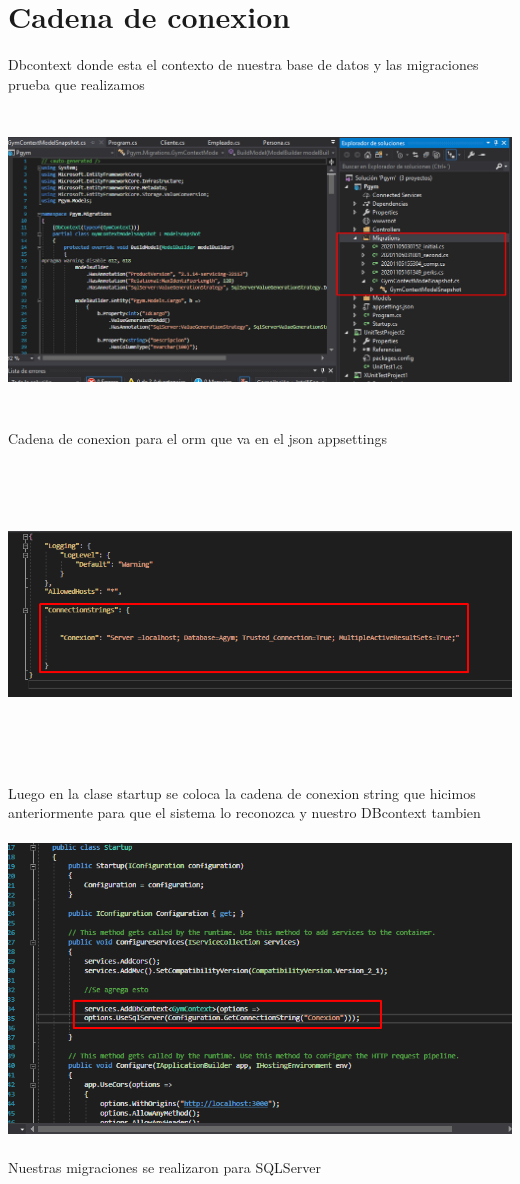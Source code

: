 \documentclass[12pt,letterpaper]{article}
\begin{document}
\section{Cadena de conexion }
Dbcontext donde esta el contexto de nuestra base de datos y las migraciones prueba que realizamos
\begin{center}
    \includegraphics[width=18cm, height=8cm]{img/dbcontesx y migraciones.png}  
\end{center}
\newpage
Cadena de conexion para el orm que va en el json appsettings
\begin{center}
    \includegraphics[width=16cm, height=8cm]{img/conexion a la db.png}  
\end{center}

Luego en la clase startup se coloca la cadena de conexion string que hicimos anteriormente
para que el sistema lo reconozca y nuestro DBcontext tambien
\begin{center}
    \includegraphics[width=16cm, height=8cm]{img/contex2.png}  
\end{center}
Nuestras migraciones se realizaron para SQLServer
\end{document}

